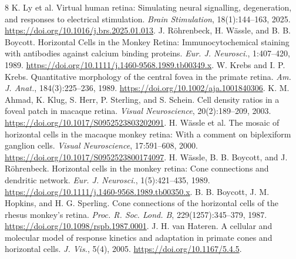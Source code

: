 \documentclass[a4paper,uplatex,dvipdfmx]{jsarticle}
\begin{document}
\clearpage
{\footnotesize
\begin{thebibliography}{8}
\setlength{\itemsep}{0pt}
K. Ly et al.
Virtual human retina: Simulating neural signalling, degeneration, and responses to electrical stimulation.
\textit{Brain Stimulation}, 18(1):144--163, 2025.
\url{https://doi.org/10.1016/j.brs.2025.01.013}.
J. Röhrenbeck, H. Wässle, and B. B. Boycott.
Horizontal Cells in the Monkey Retina: Immunocytochemical staining with antibodies against calcium binding proteins.
\textit{Eur. J. Neurosci.}, 1:407--420, 1989.
\url{https://doi.org/10.1111/j.1460-9568.1989.tb00349.x}.
W. Krebs and I. P. Krebs.
Quantitative morphology of the central fovea in the primate retina.
\textit{Am. J. Anat.}, 184(3):225--236, 1989.
\url{https://doi.org/10.1002/aja.1001840306}.
K. M. Ahmad, K. Klug, S. Herr, P. Sterling, and S. Schein.
Cell density ratios in a foveal patch in macaque retina.
\textit{Visual Neuroscience}, 20(2):189--209, 2003.
\url{https://doi.org/10.1017/S0952523803202091}.
H. Wässle et al.
The mosaic of horizontal cells in the macaque monkey retina: With a comment on biplexiform ganglion cells.
\textit{Visual Neuroscience}, 17:591--608, 2000.
\url{https://doi.org/10.1017/S0952523800174097}.
H. Wässle, B. B. Boycott, and J. Röhrenbeck.
Horizontal cells in the monkey retina: Cone connections and dendritic network.
\textit{Eur. J. Neurosci.}, 1(5):421--435, 1989.
\url{https://doi.org/10.1111/j.1460-9568.1989.tb00350.x}.
B. B. Boycott, J. M. Hopkins, and H. G. Sperling.
Cone connections of the horizontal cells of the rhesus monkey's retina.
\textit{Proc. R. Soc. Lond. B}, 229(1257):345--379, 1987.
\url{https://doi.org/10.1098/rspb.1987.0001}.
J. H. van Hateren.
A cellular and molecular model of response kinetics and adaptation in primate cones and horizontal cells.
\textit{J. Vis.}, 5(4), 2005.
\url{https://doi.org/10.1167/5.4.5}.
\end{thebibliography}
}
\end{document}
